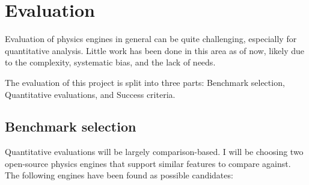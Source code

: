 \documentclass[12pt,a4paper,twoside,openright]{report}
\begin{document}
\chapter{Evaluation}\label{chap4}


Evaluation of physics engines in general can be quite challenging, 
especially for quantitative analysis.
Little work has been done in this area as of now, 
likely due to the complexity, systematic bias, and the lack of needs.

The evaluation of this project is split into three parts: Benchmark selection, Quantitative evaluations, and Success criteria.

\section{Benchmark selection}

Quantitative evaluations will be largely comparison-based. 
I will be choosing two open-source physics engines that support similar features to compare against.
The following engines have been found as possible candidates:

\begin{table}[h]
  \centering
\end{table}
\end{document}
